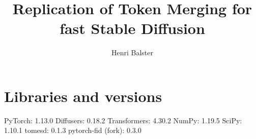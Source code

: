 \documentclass[12pt,a4paper]{article}
\title{Replication of Token Merging for fast Stable Diffusion}
\author{Henri Balster}
\date{}
\begin{document}

\newpage
\tableofcontents
\onehalfspacing
\newpage
{}




\newpage


\newpage


\newpage


\newpage


\newpage


\newpage


\newpage
\section*{Libraries and versions}
PyTorch: 1.13.0
Diffusers: 0.18.2
Transformers: 4.30.2
NumPy: 1.19.5
SciPy: 1.10.1
tomesd: 0.1.3
pytorch-fid (fork): 0.3.0

\newpage
{}


\newpage


\end{document}
